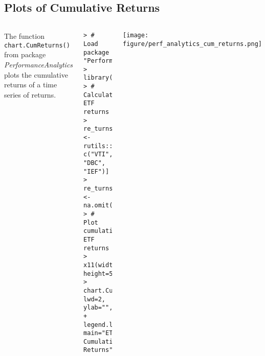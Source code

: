 \documentclass[10pt]{beamer}\usepackage[]{graphicx}\usepackage[]{color}
\makeatletter
\newenvironment{kframe}{%
 \def\at@end@of@kframe{}%
 \ifinner\ifhmode%
  \def\at@end@of@kframe{\end{minipage}}%
  \begin{minipage}{\columnwidth}%
 \fi\fi%
 \def\FrameCommand##1{\hskip\@totalleftmargin \hskip-\fboxsep
 \colorbox{shadecolor}{##1}\hskip-\fboxsep
     \hskip-\linewidth \hskip-\@totalleftmargin \hskip\columnwidth}%
 \MakeFramed {\advance\hsize-\width
   \@totalleftmargin\z@ \linewidth\hsize
   \@setminipage}}%
 {\par\unskip\endMakeFramed%
 \at@end@of@kframe}
\newenvironment{knitrout}{}{} %
\makeatother
\begin{document}
\subsection{Plots of Cumulative Returns}
\begin{frame}[fragile,t]{\subsecname}
\vspace{-1em}
\begin{block}{}
  \begin{columns}[T]
      The function \texttt{chart.CumReturns()} from package \emph{PerformanceAnalytics} plots the cumulative returns of a time series of returns.
\begin{knitrout}\tiny
{}\color{fgcolor}\begin{kframe}
\begin{verbatim}
> # Load package "PerformanceAnalytics"
> library(PerformanceAnalytics)
> # Calculate ETF returns
> re_turns <- rutils::etf_env$re_turns[, c("VTI", "DBC", "IEF")]
> re_turns <- na.omit(re_turns)
> # Plot cumulative ETF returns
> x11(width=6, height=5)
> chart.CumReturns(re_turns, lwd=2, ylab="",
+   legend.loc="topleft", main="ETF Cumulative Returns")
\end{verbatim}
\end{kframe}
\end{knitrout}
    \vspace{-1em}
      \texttt{[image: figure/perf\_analytics\_cum\_returns.png]}
  \end{columns}
\end{block}

\end{frame}


\end{document}
